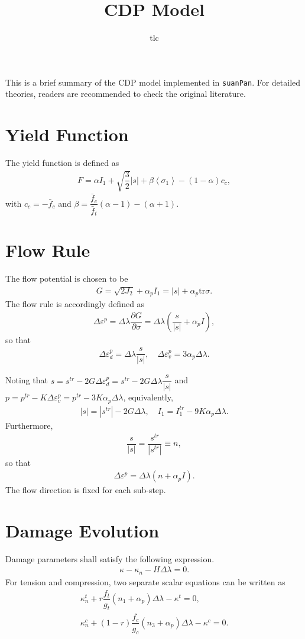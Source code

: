 \documentclass[10pt,fleqn,3p]{elsarticle}
\title{CDP Model}\date{}\author{tlc}
\newcommand*{\tr}[1]{\mathrm{tr}#1}
\newcommand*{\pfrac}[2]{\dfrac{\partial#1}{\partial#2}}
\begin{document}
\pagestyle{empty}
This is a brief summary of the CDP model implemented in \texttt{suanPan}. For detailed theories, readers are recommended to check the original literature.
\section{Yield Function}
The yield function is defined as
\begin{gather}
F=\alpha{}I_1+\sqrt{\dfrac{3}{2}}|s|+\beta\left<\sigma_1\right>-\left(1-\alpha\right)c_c,
\end{gather}
with $c_c=-\bar{f}_c$ and $\beta=\dfrac{\bar{f}_c}{\bar{f}_t}(\alpha-1)-(\alpha+1)$.
\section{Flow Rule}
The flow potential is chosen to be
\begin{gather}
G=\sqrt{2J_2}+\alpha_pI_1=|s|+\alpha_p\tr{\sigma}.
\end{gather}
The flow rule is accordingly defined as
\begin{gather}
\Delta\varepsilon^p=\Delta\lambda\pfrac{G}{\sigma}=\Delta\lambda\left(\dfrac{s}{|s|}+\alpha_pI\right),
\end{gather}
so that
\begin{gather}
\Delta\varepsilon^p_d=\Delta\lambda\dfrac{s}{|s|},\quad\Delta\varepsilon^p_v=3\alpha_p\Delta\lambda.
\end{gather}

Noting that $s=s^{tr}-2G\Delta\varepsilon^p_d=s^{tr}-2G\Delta\lambda\dfrac{s}{|s|}$ and $p=p^{tr}-K\Delta\varepsilon^p_v=p^{tr}-3K\alpha_p\Delta\lambda$, equivalently,
\begin{gather}
|s|=|s^{tr}|-2G\Delta\lambda,\quad{}I_1=I_1^{tr}-9K\alpha_p\Delta\lambda.
\end{gather}
Furthermore,
\begin{gather}
\dfrac{s}{|s|}=\dfrac{s^{tr}}{|s^{tr}|}\equiv{}n,
\end{gather}
so that
\begin{gather}
\Delta\varepsilon^p=\Delta\lambda\left(n+\alpha_pI\right).
\end{gather}
The flow direction is fixed for each sub-step.
\section{Damage Evolution}
Damage parameters shall satisfy the following expression.
\begin{gather}
\kappa-\kappa_n-H\Delta\lambda=0.
\end{gather}
For tension and compression, two separate scalar equations can be written as
\begin{gather}
\kappa^t_n+r\dfrac{f_t}{g_t}(n_1+\alpha_p)\Delta\lambda-\kappa^t=0,\\
\kappa^c_n+(1-r)\dfrac{f_c}{g_c}(n_3+\alpha_p)\Delta\lambda-\kappa^c=0.
\end{gather}
\end{document}
